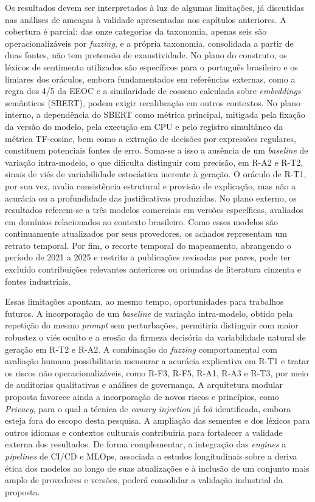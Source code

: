 Os resultados devem ser interpretados à luz de algumas limitações, já discutidas nas análises de ameaças à validade apresentadas nos capítulos anteriores. A cobertura é parcial: das onze categorias da taxonomia, apenas seis são operacionalizáveis por \textit{fuzzing}, e a própria taxonomia, consolidada a partir de duas fontes, não tem pretensão de exaustividade. No plano do construto, os léxicos de sentimento utilizados são específicos para o português brasileiro e os limiares dos oráculos, embora fundamentados em referências externas, como a regra dos 4/5 da EEOC e a similaridade de cosseno calculada sobre \textit{embeddings} semânticos (SBERT), podem exigir recalibração em outros contextos. No plano interno, a dependência do SBERT como métrica principal, mitigada pela fixação da versão do modelo, pela execução em CPU e pelo registro simultâneo da métrica TF-cosine, bem como a extração de decisões por expressões regulares, constituem potenciais fontes de erro. Soma-se a isso a ausência de um \textit{baseline} de variação intra-modelo, o que dificulta distinguir com precisão, em R-A2 e R-T2, sinais de viés de variabilidade estocástica inerente à geração. O oráculo de R-T1, por sua vez, avalia consistência estrutural e provisão de explicação, mas não a acurácia ou a profundidade das justificativas produzidas. No plano externo, os resultados referem-se a três modelos comerciais em versões específicas, avaliados em domínios relacionados ao contexto brasileiro. Como esses modelos são continuamente atualizados por seus provedores, os achados representam um retrato temporal. Por fim, o recorte temporal do mapeamento, abrangendo o período de 2021 a 2025 e restrito a publicações revisadas por pares, pode ter excluído contribuições relevantes anteriores ou oriundas de literatura cinzenta e fontes industriais.

Essas limitações apontam, ao mesmo tempo, oportunidades para trabalhos futuros. A incorporação de um \textit{baseline} de variação intra-modelo, obtido pela repetição do mesmo \textit{prompt} sem perturbações, permitiria distinguir com maior robustez o viés oculto e a erosão da firmeza decisória da variabilidade natural de geração em R-T2 e R-A2. A combinação do \textit{fuzzing} comportamental com avaliação humana possibilitaria mensurar a acurácia explicativa em R-T1 e tratar os riscos não operacionalizáveis, como R-F3, R-F5, R-A1, R-A3 e R-T3, por meio de auditorias qualitativas e análises de governança. A arquitetura modular proposta favorece ainda a incorporação de novos riscos e princípios, como \textit{Privacy}, para o qual a técnica de \textit{canary injection} já foi identificada, embora esteja fora do escopo desta pesquisa. A ampliação das sementes e dos léxicos para outros idiomas e contextos culturais contribuiria para fortalecer a validade externa dos resultados. De forma complementar, a integração das \textit{engines} a \textit{pipelines} de CI/CD e MLOps, associada a estudos longitudinais sobre a deriva ética dos modelos ao longo de suas atualizações e à inclusão de um conjunto mais amplo de provedores e versões, poderá consolidar a validação industrial da proposta.

